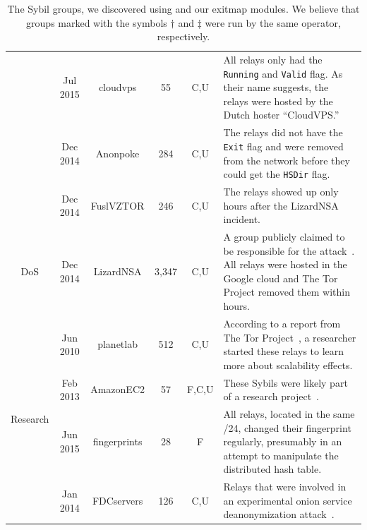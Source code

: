 \begin{table}[ht!]
\begin{tabularx}{\textwidth}{c|c c c c X}
& Jul 2015 & cloudvps & 55 & C,U & All relays only had the \texttt{Running} and
\texttt{Valid} flag.  As their name suggests, the relays were hosted by the
Dutch hoster ``CloudVPS.'' \\

& Dec 2014 & Anonpoke & 284 & C,U & The relays did not have the \texttt{Exit} flag
and were removed from the network before they could get the \texttt{HSDir} flag.
\\

& Dec 2014 & FuslVZTOR & 246 & C,U & The relays showed up only hours after the
LizardNSA incident. \\

\hline

\multirow{1}{*}{DoS}
& Dec 2014 & LizardNSA & 3,347 & C,U & A group publicly claimed to be responsible
for the attack~\cite{lizards}.  All relays were hosted in the Google cloud and
The Tor Project removed them within hours. \\

\hline

\multirow{4}{*}{Research}
& Jun 2010 & planetlab & 512 & C,U & According to a report from The Tor
Project~\cite{progressreport}, a researcher started these relays to learn more
about scalability effects. \\

& Feb 2013 & AmazonEC2 & 57 & F,C,U & These Sybils were likely part of a research
project~\cite{Biryukov2013a}. \\

& Jun 2015 & fingerprints & 28 & F & All relays, located in the same /24, changed
their fingerprint regularly, presumably in an attempt to manipulate the
distributed hash table. \\

& Jan 2014 & FDCservers & 126 & C,U & Relays that were involved in an
experimental onion service deanonymization attack~\cite{cmucert}. \\
\hline

\end{tabularx}
\caption{The Sybil groups, we discovered using \sys and our exitmap
modules.  We believe that groups marked with the
symbols $\dagger$ and $\ddagger$ were run by the same operator, respectively.}
\label{tab:sybils}
\end{table}

